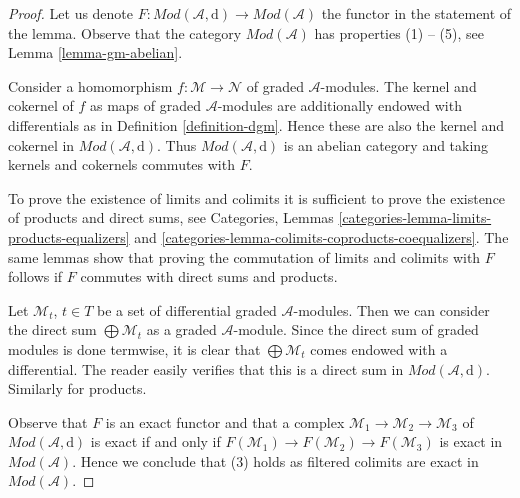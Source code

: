 \documentclass[10pt,a4paper]{amsart}
\theoremstyle{plain}
\theoremstyle{definition}
\theoremstyle{remark}
\numberwithin{equation}{subsection}
\begin{document}
\begin{proof}
Let us denote
$F : \textit{Mod}(\mathcal{A}, \text{d}) \to \textit{Mod}(\mathcal{A})$
the functor in the statement of the lemma. Observe that
the category $\textit{Mod}(\mathcal{A})$ has properties (1) -- (5), see
Lemma \ref{lemma-gm-abelian}.

\medskip\noindent
Consider a homomorphism $f : \mathcal{M} \to \mathcal{N}$
of graded $\mathcal{A}$-modules. The kernel
and cokernel of $f$ as maps of graded $\mathcal{A}$-modules
are additionally endowed with differentials as in
Definition \ref{definition-dgm}. Hence these are also
the kernel and cokernel in $\textit{Mod}(\mathcal{A}, \text{d})$.
Thus $\textit{Mod}(\mathcal{A}, \text{d})$ is an abelian category
and taking kernels and cokernels commutes with $F$.

\medskip\noindent
To prove the existence of limits and colimits it is sufficient
to prove the existence of products and direct sums, see
Categories, Lemmas \ref{categories-lemma-limits-products-equalizers} and
\ref{categories-lemma-colimits-coproducts-coequalizers}.
The same lemmas show that
proving the commutation of limits and colimits with $F$
follows if $F$ commutes with direct sums and products.

\medskip\noindent
Let $\mathcal{M}_t$, $t \in T$ be a set of differential
graded $\mathcal{A}$-modules. Then we can consider the direct
sum $\bigoplus \mathcal{M}_t$ as a graded $\mathcal{A}$-module.
Since the direct sum of graded modules is done termwise, it is
clear that $\bigoplus \mathcal{M}_t$ comes endowed with a differential.
The reader easily verifies that this is a direct sum in
$\textit{Mod}(\mathcal{A}, \text{d})$. Similarly for products.

\medskip\noindent
Observe that $F$ is an exact functor and that
a complex $\mathcal{M}_1 \to \mathcal{M}_2 \to \mathcal{M}_3$
of $\textit{Mod}(\mathcal{A}, \text{d})$ is exact if and only if
$F(\mathcal{M}_1) \to F(\mathcal{M}_2) \to F(\mathcal{M}_3)$
is exact in $\textit{Mod}(\mathcal{A})$. Hence we conclude that (3)
holds as filtered colimits are exact in
$\textit{Mod}(\mathcal{A})$.
\end{proof}
\end{document}
